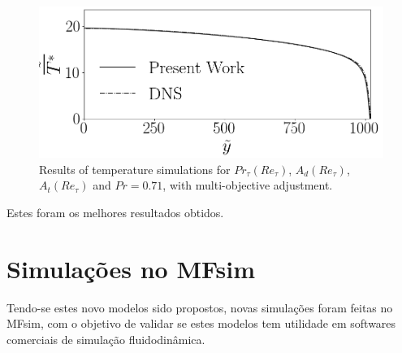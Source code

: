 \begin{figure}[!h]
\begin{minipage}[t]{0.5\textwidth}
	\end{minipage}
	\begin{minipage}[t]{0.45\textwidth}
		\centering
		\includegraphics[angle=0, scale=0.24]{fotos_formatacao_final/Temperature_1000_071_Genetic2temperature}
	\end{minipage}	
	\caption{Results of temperature simulations for $Pr_\tau(Re_\tau)$, $A_d(Re_\tau)$, $A_t(Re_\tau) $ and $Pr =0.71$, with multi-objective adjustment.}
\end{figure}

Estes foram os melhores resultados obtidos.


\chapter{Simulações no MFsim}

Tendo-se estes novo modelos sido propostos, novas simulações foram feitas no MFsim, com o objetivo de validar se estes modelos tem utilidade em softwares comerciais de simulação fluidodinâmica.
